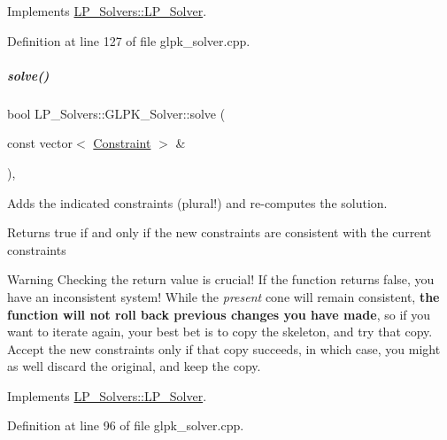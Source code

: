 Implements \hyperlink{group___c_l_s_solvers_a8b9979fb228ac9ccfe037ad6ca48b314}{L\+P\+\_\+\+Solvers\+::\+L\+P\+\_\+\+Solver}.



Definition at line 127 of file glpk\+\_\+solver.\+cpp.

\mbox{\label{group___c_l_s_solvers_a08fcdf86d0fcd8ac3e5da077b627e477}} 
\subparagraph{\texorpdfstring{solve()}{solve()}\hspace{0.1cm}{\footnotesize\ttfamily [2/2]}}
{\footnotesize\ttfamily bool L\+P\+\_\+\+Solvers\+::\+G\+L\+P\+K\+\_\+\+Solver\+::solve (\begin{DoxyParamCaption}\item[{const vector$<$ \hyperlink{group___c_l_s_solvers_class_l_p___solvers_1_1_constraint}{Constraint} $>$ \&}]{ }\end{DoxyParamCaption})\hspace{0.3cm}{\ttfamily [override]}, {\ttfamily [virtual]}}



Adds the indicated constraints (plural!) and re-\/computes the solution. 

\begin{DoxyReturn}{Returns}
{\ttfamily true} if and only if the new constraints are consistent with the current constraints
\end{DoxyReturn}
\begin{DoxyWarning}{Warning}
Checking the return value is crucial! If the function returns {\ttfamily false}, you have an inconsistent system! While the {\itshape present} cone will remain consistent, {\bfseries the function will not roll back previous changes you have made}, so if you want to iterate again, your best bet is to copy the skeleton, and try that copy. Accept the new constraints only if that copy succeeds, in which case, you might as well discard the original, and keep the copy. 
\end{DoxyWarning}


Implements \hyperlink{group___c_l_s_solvers_aea1a5bf98a2c4c06b0550cacdf8b88fd}{L\+P\+\_\+\+Solvers\+::\+L\+P\+\_\+\+Solver}.



Definition at line 96 of file glpk\+\_\+solver.\+cpp.

